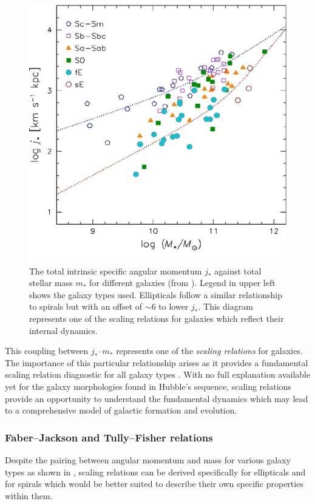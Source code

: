 \documentclass[12pt, twocolumn]{revtex4-1}    %
\begin{document}
\begin{figure}
\includegraphics[width=1.0\linewidth]{introduction/romanowsky_2012_fig_3}
\caption{The total intrinsic specific angular momentum $j_*$ against total stellar mass $m_*$ for different galaxies (from \citealt{2012ApJS..203...17R}). Legend in upper left shows the galaxy types used. Ellipticals follow a similar relationship to spirals but with an offset of $\sim6$ to lower $j_*$. This diagram represents one of the scaling relations for galaxies which reflect their internal dynamics.}
\label{fig:romanowsky_fall_2012}
\end{figure}

This coupling between $j_*$--$m_*$ represents one of the \textit{scaling relations} for galaxies. The importance of this particular relationship arises as it provides a fundamental scaling relation diagnostic for all galaxy types \citep{2012ApJS..203...17R}. With no full explanation available yet for the galaxy morphologies found in Hubble's sequence, scaling relations provide an opportunity to understand the fundamental dynamics which may lead to a comprehensive model of galactic formation and evolution.

\vspace{2ex} %
\subsubsection{Faber--Jackson and Tully--Fisher relations}
\noindent
Despite the pairing between angular momentum and mass for various galaxy types as shown in \cite{2012ApJS..203...17R}, scaling relations can be derived specifically for ellipticals and for spirals which would be better suited to describe their own specific properties within them.  
\end{document}
